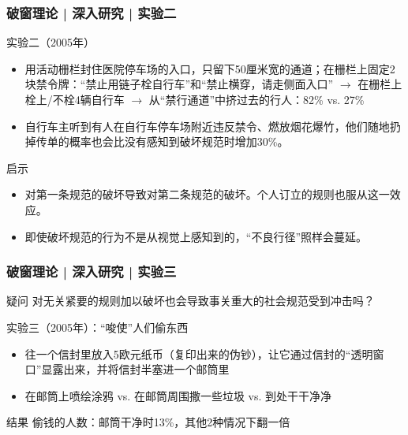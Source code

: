 \begin{frame}
  \frametitle{破窗理论 | 深入研究 | 实验二}
  \begin{block}{实验二（2005年）}
    \begin{itemize}
      \item 用活动栅栏封住医院停车场的入口，只留下50厘米宽的通道；在栅栏上固定2块禁令牌：“禁止用链子栓自行车”和“禁止横穿，请走侧面入口” $\rightarrow$ 在栅栏上栓上/不栓4辆自行车 $\rightarrow$ 从“禁行通道”中挤过去的行人：82\% vs. 27\%
      \item 自行车主听到有人在自行车停车场附近违反禁令、燃放烟花爆竹，他们随地扔掉传单的概率也会比没有感知到破坏规范时增加30\%。
    \end{itemize}
  \end{block}
  \pause
  \begin{block}{\alert{启示}}
    \begin{itemize}
      \item 对第一条规范的破坏导致对第二条规范的破坏。个人订立的规则也服从这一效应。
      \item 即使破坏规范的行为不是从视觉上感知到的，“不良行径”照样会蔓延。
    \end{itemize}
  \end{block}
\end{frame}

\begin{frame}
  \frametitle{破窗理论 | 深入研究 | 实验三}
  \begin{block}{疑问}
 对无关紧要的规则加以破坏也会导致事关重大的社会规范受到冲击吗？ 
  \end{block}
  \pause
  \begin{block}{实验三（2005年）：“唆使”人们偷东西}
    \begin{itemize}
      \item 往一个信封里放入5欧元纸币（复印出来的伪钞），让它通过信封的“透明窗口”显露出来，并将信封半塞进一个邮筒里
      \item 在邮筒上喷绘涂鸦 vs. 在邮筒周围撒一些垃圾 vs. 到处干干净净
    \end{itemize}
  \end{block}
  \pause
  \begin{block}{结果}
    偷钱的人数：邮筒干净时13\%，其他2种情况下翻一倍
  \end{block}
\end{frame}

